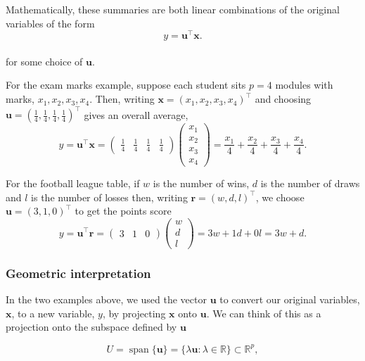 \documentclass[
]{book}
\theoremstyle{definition}
\theoremstyle{definition}
\theoremstyle{definition}
\theoremstyle{definition}
\theoremstyle{remark}
\begin{document}
Mathematically, these summaries
are both linear combinations of the
original variables of the form
\[y = \mathbf u^\top \mathbf x.\]\\
for some choice of \(\mathbf u\).

For the exam marks example, suppose each student sits \(p=4\) modules
with marks, \(x_1,x_2,x_3,x_4\). Then, writing \(\mathbf x=(x_1, x_2 , x_3, x_4)^\top\) and choosing \(\mathbf u= \left(\frac{1}{4}, \frac{1}{4}, \frac{1}{4}, \frac{1}{4} \right)^\top\)
gives an overall average,
\[ y =\mathbf u^\top \mathbf x= \begin{pmatrix} \frac{1}{4} & \frac{1}{4} & \frac{1}{4} & \frac{1}{4} \end{pmatrix} \begin{pmatrix} x_1 \\ x_2 \\ x_3 \\ x_4 \end{pmatrix} = \frac{x_1}{4} + \frac{x_2}{4} + \frac{x_3}{4} + \frac{x_4}{4}.\]

For the football league table, if \(w\) is the number of wins, \(d\) is the number of draws and \(l\) is the number of losses then, writing
\({\mathbf r}=(w,d,l)^\top\), we choose \(\mathbf u= \left(3,1,0 \right)^\top\) to get the points score
\[ y = \mathbf u^\top {\mathbf r}=\begin{pmatrix} 3 & 1 & 0 \end{pmatrix} \begin{pmatrix} w \\ d \\ l \end{pmatrix} = 3w + 1d + 0l=3w+d.\]

\hypertarget{geometric-interpretation}{%
\subsubsection*{Geometric interpretation}\label{geometric-interpretation}}

In the two examples above, we used the vector \(\mathbf u\) to convert our original variables, \(\mathbf x\),
to a new variable, \(y\), by projecting \(\mathbf x\) onto \(\mathbf u\).
We can think of this as a projection onto the subspace defined by \(\mathbf u\)

\[U = \operatorname{span}\{\mathbf u\} = \{\lambda \mathbf u: \lambda \in \mathbb{R}\}\subset \mathbb{R}^p,\]
\end{document}
